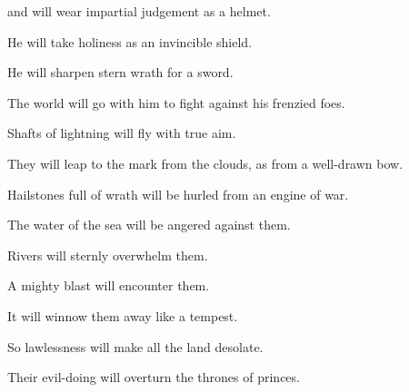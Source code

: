 {\par }{\QB and will wear impartial judgement as a helmet.
\par }{\Q {}He will take holiness as an invincible shield.
\par }{\QB {}He will sharpen stern wrath for a sword.
\par }{\QB The world will go with him to fight against his frenzied foes.
\par }{\Q {}Shafts of lightning will fly with true aim.
\par }{\QB They will leap to the mark from the clouds, as from a well-drawn bow.
\par }{\Q {}Hailstones full of wrath will be hurled from an engine of war.
\par }{\QB The water of the sea will be angered against them.
\par }{\QB Rivers will sternly overwhelm them.
\par }{\Q {}A mighty blast will encounter them.
\par }{\QB It will winnow them away like a tempest.
\par }{\Q So lawlessness will make all the land desolate.
\par }{\QB Their evil-doing will overturn the thrones of princes.

}
